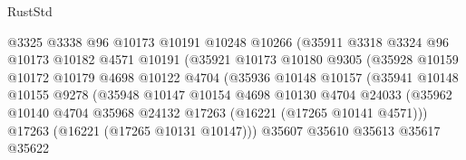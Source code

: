 \begin{lexlean}{RustStd}
\begin{coremodule}
                                  @3325
                                  @3338
                                  @96
                                  @10173
                                  @10191
                                  @10248
                                  @10266
                                  (@35911
                                    @3318
                                    @3324
                                    @96
                                    @10173
                                    @10182
                                    @4571
                                    @10191
                                    (@35921
                                      @10173
                                      @10180
                                      @9305
                                      (@35928
                                        @10159
                                        @10172
                                        @10179
                                        @4698
                                        @10122
                                        @4704
                                        (@35936
                                          @10148
                                          @10157
                                          (@35941
                                            @10148
                                            @10155
                                            @9278
                                            (@35948
                                              @10147
                                              @10154
                                              @4698
                                              @10130
                                              @4704
                                              @24033
                                              (@35962
                                                @10140
                                                @4704
                                                @35968
                                                @24132
                                                @17263
                                                (@16221 (@17265 @10141 @4571)))
                                              @17263
                                              (@16221 (@17265 @10131 @10147)))
                                            @35607
                                            @35610
                                            @35613
                                            @35617
                                            @35622

\end{coremodule}
\end{lexlean}
